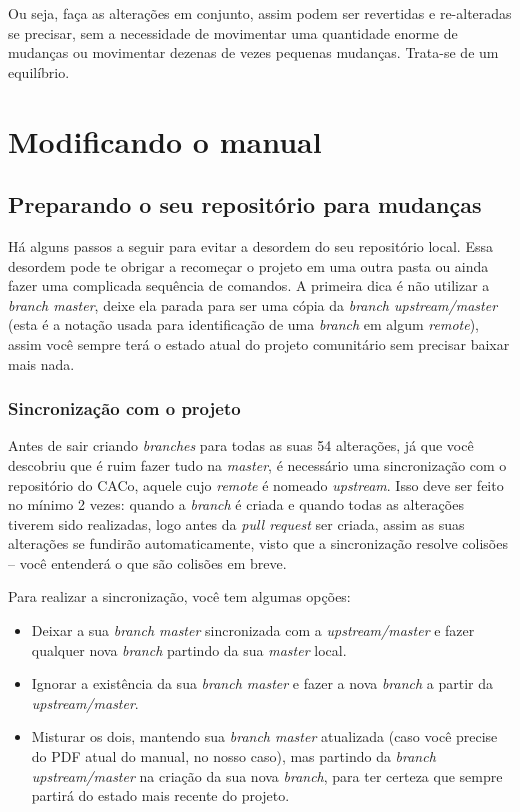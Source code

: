 \documentclass[a4paper,oneside,10pt]{memoir}
\begin{document}
Ou seja, faça as alterações em conjunto, assim podem ser revertidas e
re-alteradas se precisar, sem a necessidade de movimentar uma quantidade
enor\-me de mudanças ou movimentar dezenas de vezes pequenas mudanças. Trata-se
de um equilíbrio.


\chapter{Modificando o manual}

\section{Preparando o seu repositório para mudanças}

Há alguns passos a seguir para evitar a desordem do seu repositório local. Essa
desordem pode te obrigar a recomeçar o projeto em uma outra pasta ou ainda
fazer uma complicada sequência de comandos. A primeira dica é não utilizar a
\emph{branch master}, deixe ela parada para ser uma cópia da \emph{branch
upstream/master} (esta é a notação usada para identificação de uma
\emph{branch} em algum \emph{remote}), assim você sempre terá o estado atual do
projeto comunitário sem precisar baixar mais nada.

\subsection{Sincronização com o projeto}

Antes de sair criando \emph{branches} para todas as suas 54 alterações, já que
você descobriu que é ruim fazer tudo na \emph{master}, é necessário uma
sincronização com o repositório do CACo, aquele cujo \emph{remote} é nomeado
\emph{upstream}. Isso deve ser feito no mínimo 2 vezes: quando a \emph{branch}
é criada e quando todas as alterações tiverem sido realizadas, logo antes da
\emph{pull request} ser criada, assim as suas alterações se fundirão
automaticamente, visto que a sincronização resolve colisões -- você entenderá o
que são colisões em breve.

Para realizar a sincronização, você tem algumas opções:

\begin{itemize}%
\item Deixar a sua \emph{branch master} sincronizada com a
  \emph{upstream/master} e fazer qualquer nova \emph{branch} partindo da sua
  \emph{master} local.
\item Ignorar a existência da sua \emph{branch master} e fazer a nova
  \emph{branch} a partir da \emph{upstream/master}.
\item Misturar os dois, mantendo sua \emph{branch master} atualizada (caso você
  precise do PDF atual do manual, no nosso caso), mas partindo da \emph{branch
  upstream/master} na criação da sua nova \emph{branch}, para ter certeza que
  sempre partirá do estado mais recente do projeto.
\end{itemize}
\end{document}
